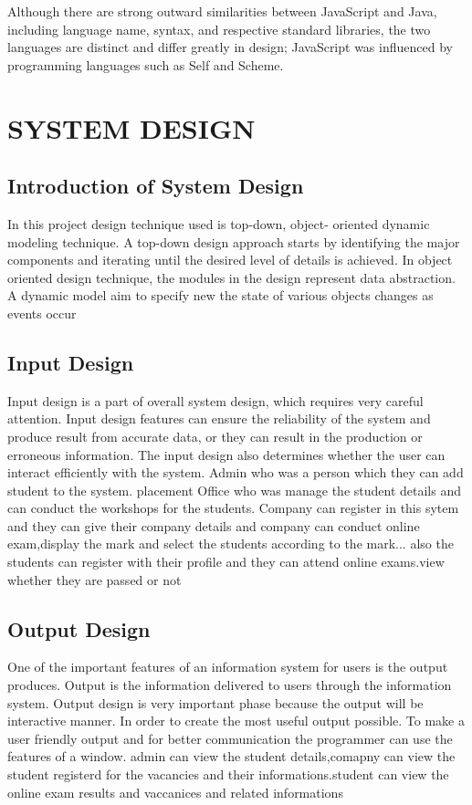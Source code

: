 \documentclass[a4paper,12pt]{article}
\begin{document}
Although there are strong outward similarities between JavaScript and Java, including language name, syntax, and respective standard libraries, the two languages are distinct and differ greatly in design; JavaScript was influenced by programming languages such as Self and Scheme.
\newpage
\section{SYSTEM DESIGN }
\hspace{5mm}
\subsection{Introduction of System Design}     
\hspace{5mm}
In this project design technique used is top-down, object- oriented dynamic modeling technique. A top-down design approach starts by identifying the major components and iterating until the desired level of details is achieved. In object oriented design technique, the modules in the design represent data abstraction. A dynamic model aim to specify new the state of various objects changes as events occur
\subsection{Input Design }
\hspace{5mm}
 Input design is a part of overall system design, which requires very careful attention. Input design features can ensure the reliability of the system and produce result from accurate data, or they can result in the production or erroneous information. The input design also determines whether the user can interact efficiently with the system. 
Admin who was a person which they can add student to the system. placement Office who was manage the student details and can conduct the workshops for the students.
Company can register in this sytem and they can give their company details and company can conduct online exam,display the mark and select the students according to the mark...
also the students can register with their profile and they can attend online exams.view whether they are passed or not
\newpage
\subsection{Output Design}
\hspace{5mm}
One of the important features of an information system for users is the output produces. Output is the information delivered to users through the information system. Output design is very important phase because the output will be interactive manner. In order to create the most useful output possible. To make a user friendly output and for better communication the programmer can use the features of a window. 
admin can view the student details,comapny can view the student registerd for the vacancies and their informations.student can view the online exam results and vaccanices and related informations
\end{document}
